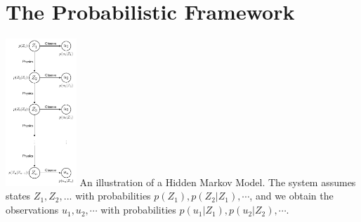\section*{The Probabilistic Framework}

\includegraphics[width=0.2\textwidth]{figures/hmm-graph/hmm-graph.pdf}
An illustration of a Hidden Markov Model. The system assumes states $Z_1, Z_2, ...$ with probabilities $p(Z_1), p(Z_2|Z_1), \cdots$, and we obtain the observations $u_1, u_2, \cdots$ with probabilities $p(u_1|Z_1), p(u_2|Z_2), \cdots$.

